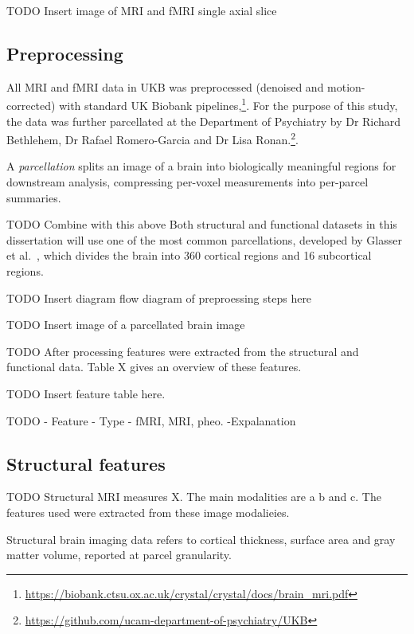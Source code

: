 TODO Insert image of MRI and fMRI single axial slice

\subsection{Preprocessing}

All MRI and fMRI data in UKB was preprocessed (denoised and motion-corrected) with standard UK Biobank pipelines,\footnote{\url{https://biobank.ctsu.ox.ac.uk/crystal/crystal/docs/brain_mri.pdf}}. For the purpose of this study, the data was further parcellated at the Department of Psychiatry by Dr Richard Bethlehem, Dr Rafael Romero-Garcia and Dr Lisa Ronan.\footnote{\url{https://github.com/ucam-department-of-psychiatry/UKB}}.

A \textit{parcellation} splits an image of a brain into biologically meaningful regions for downstream analysis, compressing per-voxel measurements into per-parcel summaries.

TODO Combine with this above
Both structural and functional datasets in this dissertation will use one of the most common parcellations, developed by Glasser et al.~\cite{glasser2016multi}, which divides the brain into 360 cortical regions and 16 subcortical regions. 

TODO Insert diagram flow diagram of preproessing steps here

TODO Insert image of a parcellated brain image

TODO After processing features were extracted from the structural and functional data. Table X gives an overview of these features.

TODO Insert feature table here.

TODO - Feature
- Type - fMRI, MRI, pheo.
-Expalanation

\subsection{Structural features}
TODO Structural MRI measures X. The main modalities are a b and c. The features used were extracted from these image modalieies.

Structural brain imaging data refers to cortical thickness, surface area and gray matter volume, reported at parcel granularity.

